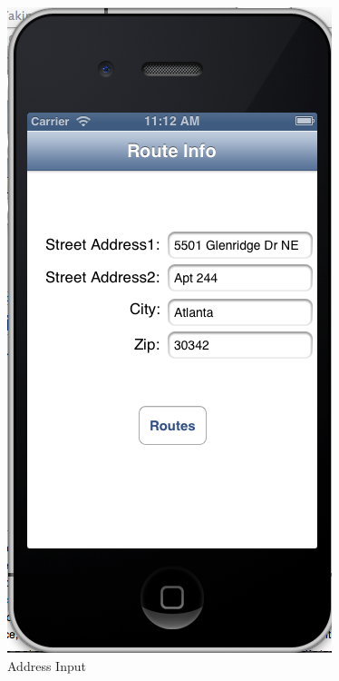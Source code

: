 \documentclass[10pt]{sigplan-proc-varsize}
\begin{document}
\begin{figure}[h!]
  \caption{Address Input}
  \centering
    \includegraphics[scale=0.4]{address}
\end{figure}
\end{document}
